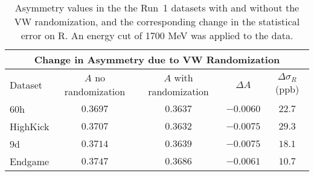 \begin{table}
\centering
\small
\setlength\tabcolsep{10pt}
\renewcommand{\arraystretch}{1.2}
\begin{tabular*}{1\linewidth}{@{\extracolsep{\fill}}lcccc}
  \hline
    \multicolumn{5}{c}{\textbf{Change in Asymmetry due to VW Randomization}} \\
  \hline\hline
    Dataset & $A$ no randomization & $A$ with randomization & $\Delta A$ & $\Delta \sigma_{R}$ (ppb) \\
  \hline
    60h & $0.3697$ & $0.3637$ & $-0.0060$ & $22.7$ \\
    HighKick & $0.3707$ & $0.3632$ & $-0.0075$ & $29.3$ \\
    9d & $0.3714$ & $0.3639$ & $-0.0075$ & $18.1$ \\
    Endgame & $0.3747$ & $0.3686$ & $-0.0061$ & $10.7$ \\
  \hline
\end{tabular*}
\caption[Asymmetry values in Run~1 datasets with VW time randomization]{Asymmetry values in the the Run~1 datasets with and without the VW randomization, and the corresponding change in the statistical error on R. An energy cut of 1700 MeV was applied to the data.}
\label{tab:A_change}
\end{table}



